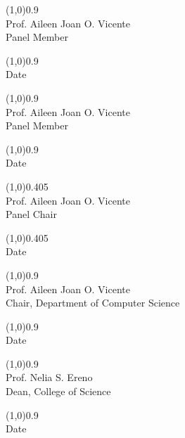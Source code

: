 \documentclass{report}
\begin{document}
\begin{center}
	\begin{minipage}[t]{0.45\textwidth}
		\centering
		\line(1,0){0.9\textwidth}\\
		Prof. Aileen Joan O. Vicente\\
		Panel Member

		\par\vspace{0.5cm}
		\line(1,0){0.9\textwidth}\\
		Date
	\end{minipage}
	\begin{minipage}[t]{0.45\textwidth}
		\centering
		\line(1,0){0.9\textwidth}\\
		Prof. Aileen Joan O. Vicente\\
		Panel Member

		\par\vspace{0.5cm}
		\line(1,0){0.9\textwidth}\\
		Date
	\end{minipage}

	\par\vspace{2cm}

	\line(1,0){0.405\textwidth}\\
	Prof. Aileen Joan O. Vicente\\
	Panel Chair

	\par\vspace{0.5cm}
	\line(1,0){0.405\textwidth}\\
	Date

	\par\vspace{2cm}

	\begin{minipage}{0.45\textwidth}
		\centering
		\line(1,0){0.9\textwidth}\\
		Prof. Aileen Joan O. Vicente\\
		Chair, Department of Computer Science

		\par\vspace{0.5cm}
		\line(1,0){0.9\textwidth}\\
		Date
	\end{minipage}
	\begin{minipage}{0.45\textwidth}
		\centering
		\line(1,0){0.9\textwidth}\\
		Prof. Nelia S. Ereno\\
		Dean, College of Science

		\par\vspace{0.5cm}
		\line(1,0){0.9\textwidth}\\
		Date
	\end{minipage}
\end{center}
\end{document}
